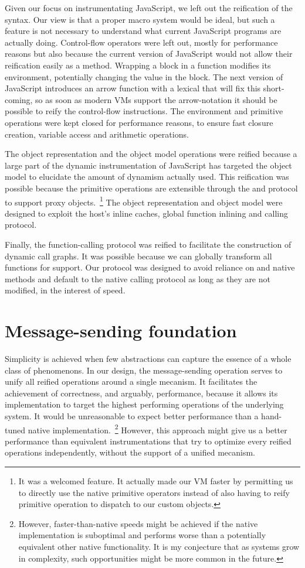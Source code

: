 Given our focus on instrumentating JavaScript, we left out the reification of
the syntax. Our view is that a proper macro system would be ideal, but such a
feature is not necessary to understand what current JavaScript programs are
actually doing. Control-flow operators were left out, mostly for performance
reasons but also because the current version of JavaScript would not allow
their reification easily as a method. Wrapping a block in a function modifies
its environment, potentially changing the  value in the block. The
next version of JavaScript introduces an arrow function with a lexical
 that will fix this short-coming, so as soon as modern VMs support the
arrow-notation it should be possible to reify the control-flow instructions.
The environment and primitive operations were kept closed for performance
reasons, to ensure fast closure creation, variable access and arithmetic
operations.

The object representation and the object model operations were reified because
a large part of the dynamic instrumentation of JavaScript has targeted the
object model to elucidate the amount of dynamism actually used. This
reification was possible because the primitive operations are extensible
through the  and  protocol to support proxy
objects.~\footnote{It was a welcomed feature. It actually made our VM faster by
permitting us to directly use the native primitive operators instead of also
having to reify primitive operation to dispatch to our custom objects.} The
object representation and object model were designed to exploit the host's
inline caches, global function inlining and calling protocol.  

Finally, the function-calling protocol was reified to facilitate the
construction of dynamic call graphs. It was possible because we can globally
transform all functions for support. Our protocol was designed to avoid
reliance on  and  native methods and default to the
native calling protocol as long as they are not modified, in the interest of
speed.

\section{Message-sending foundation}
Simplicity is achieved when few abstractions can capture the essence of a whole
class of phenomenons. In our design, the message-sending operation serves to
unify all reified operations around a single mecanism. It facilitates the
achievement of correctness, and arguably, performance, because it allows its
implementation to target the highest performing operations of the underlying
system. It would be unreasonable to expect better performance than a hand-tuned
native implementation.~\footnote{However, faster-than-native
speeds might be achieved if the native implementation is suboptimal and performs
worse than a potentially equivalent other native functionality. It is my
conjecture that as systems grow in complexity, such opportunities might be
more common in the future.} However, this approach might give us a better
performance than equivalent instrumentations that try to optimize every reified
operations independently, without the support of a unified mecanism.

